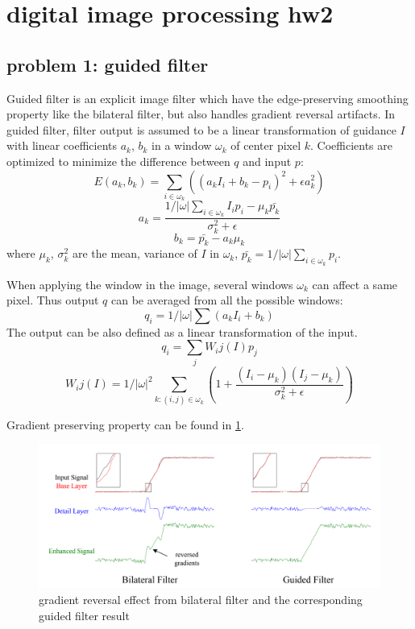 \documentclass[extendedabs]{bmvc2k}
\begin{document}
\section*{digital image processing hw2}
\subsection*{problem 1: guided filter}

Guided filter \cite{guided} is an explicit image filter which have the edge-preserving 
smoothing property like the bilateral filter, but also handles gradient reversal artifacts.
In guided filter, filter output is assumed to be a linear transformation of guidance $I$
with linear coefficients $a_k$, $b_k$ in a window $\omega_k$ of center pixel $k$.
Coefficients are optimized to minimize the difference between $q$ and input $p$:
\[E(a_k,b_k) = \sum_{i \in \omega_k}((a_kI_i + b_k - p_i)^2 + \epsilon a_k^2)\]
\[a_k=\frac{1/|\omega|\sum_{i \in \omega_k}I_ip_i - \mu_k\bar{p_k}}{\sigma_k^2+\epsilon}\]
\[b_k=\bar{p_k} - a_k\mu_k\]
where $\mu_k$, $\sigma_k^2$ are the mean, variance of $I$ in $\omega_k$, 
$\bar{p_k}=1/|\omega|\sum_{i \in \omega_k}p_i$. 

When applying the window in the image, several windows $\omega_k$ can affect a same pixel.
Thus output $q$ can be averaged from all the possible windows:
\[q_i = 1/|\omega|\sum(a_kI_i + b_k)\]
The output can be also defined as a linear transformation of the input.
\[q_i = \sum_{j}W_ij(I)p_j\]
\[W_ij(I) = 1/|\omega|^2\sum_{k:(i,j) \in \omega_k}(1 + \frac{(I_i - \mu_k)(I_j - \mu_k)}{\sigma_k^2 + \epsilon})\]

Gradient preserving property can be found in \figurename{\ref{fig:1}}.
\begin{figure}[h]
    \centering
    \includegraphics[width=\linewidth]{hw2_1_1}
    \caption{gradient reversal effect from bilateral filter and the corresponding guided filter result}
    \label{fig:1}
\end{figure}
\end{document}
